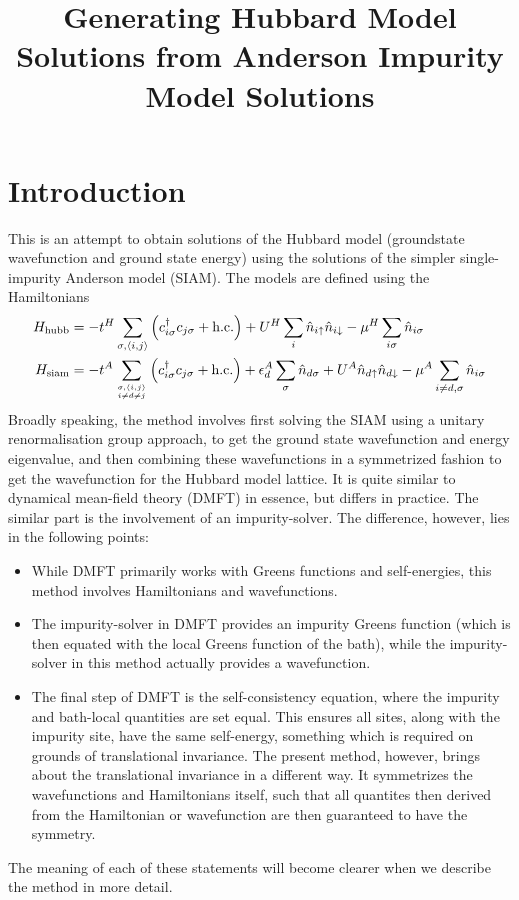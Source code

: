 \documentclass[12pt]{article}
\title{Generating Hubbard Model Solutions from Anderson Impurity Model Solutions}
\author{}%
\numberwithin{equation}{section}
\begin{document}
\maketitle
\section{Introduction}
This is an attempt to obtain solutions of the Hubbard model (groundstate wavefunction and ground state energy) using the solutions of the simpler single-impurity Anderson model (SIAM). The models are defined using the Hamiltonians
\begin{equation}\begin{aligned}
H_\text{hubb} &= -t^H\sum_{\sigma,\left<i,j \right>}\left(c^\dagger_{i\sigma} c_{j\sigma} + \text{h.c.}\right) + U^H\sum_i \hat n_{i \uparrow} \hat n_{i \downarrow} - \mu^H \sum_{i\sigma}\hat n_{i\sigma}\\
	H_\text{siam} &= -t^A\sum_{\sigma,\left<i,j \right>\atop{i \neq d \neq j}}\left(c^\dagger_{i\sigma} c_{j\sigma} + \text{h.c.}\right) + \epsilon_d^A \sum_\sigma\hat n_{d\sigma} + U^A \hat n_{d \uparrow} \hat n_{d \downarrow} - \mu^A \sum_{i\neq d,\sigma}\hat n_{i\sigma}
\end{aligned}\end{equation}
Broadly speaking, the method involves first solving the SIAM using a unitary renormalisation group approach, to get the ground state wavefunction and energy eigenvalue, and then combining these wavefunctions in a symmetrized fashion to get the wavefunction for the Hubbard model lattice. It is quite similar to dynamical mean-field theory (DMFT) in essence, but differs in practice. The similar part is the involvement of an impurity-solver. The difference, however, lies in the following points:
\begin{itemize}
	\item While DMFT primarily works with Greens functions and self-energies, this method involves Hamiltonians and wavefunctions.
	\item The impurity-solver in DMFT provides an impurity Greens function (which is then equated with the local Greens function of the bath), while the impurity-solver in this method actually provides a wavefunction.
	\item The final step of DMFT is the self-consistency equation, where the impurity and bath-local quantities are set equal. This ensures all sites, along with the impurity site, have the same self-energy, something which is required on grounds of  translational invariance. The present method, however, brings about the translational invariance in a different way. It symmetrizes the wavefunctions and Hamiltonians itself, such that all quantites then derived from the Hamiltonian or wavefunction are then guaranteed to have the symmetry.
\end{itemize}
The meaning of each of these statements will become clearer when we describe the method in more detail.
\end{document}
